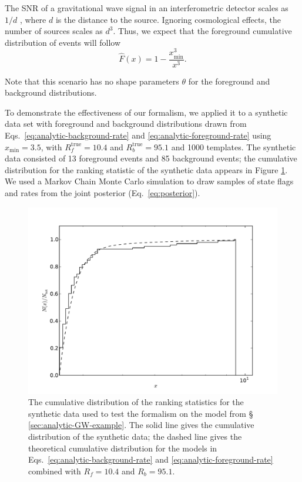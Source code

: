 \documentclass[aps,prd,reprint,nofootinbib]{revtex4-1}
\newcommand{\xmin}{x_\mathrm{min}}
\begin{document}
The SNR of a gravitational wave signal in an interferometric detector
scales as $1/d$ \citep{Finn1992}, where $d$ is the distance to the
source.  Ignoring cosmological effects, the number of sources scales
as $d^3$.  Thus, we expect that the foreground cumulative distribution
of events will follow
\begin{equation}
  \label{eq:analytic-foreground-rate}
  \hat{F}(x) = 1 - \frac{\xmin^3}{x^3}.
\end{equation}

Note that this scenario has no shape parameters $\theta$ for the
foreground and background distributions.

To demonstrate the effectiveness of our formalism, we applied it to a
synthetic data set with foreground and background distributions drawn
from Eqs.~\eqref{eq:analytic-background-rate} and
\eqref{eq:analytic-foreground-rate} using $x_\mathrm{min} = 3.5$, with
$R_f^\mathrm{true} = 10.4$ and $R_b^\mathrm{true} = 95.1$ and 1000
templates.  The synthetic data consisted of 13 foreground events and
85 background events; the cumulative distribution for the ranking
statistic of the synthetic data appears in Figure
\ref{fig:analytic-data-cumulative}.  We used a Markov Chain Monte
Carlo simulation to draw samples of state flags and rates from the
joint posterior (Eq.~\eqref{eq:posterior}).

\begin{figure}
  \includegraphics[width=\columnwidth]{data}
  \caption{\label{fig:analytic-data-cumulative} The cumulative
    distribution of the ranking statistics for the synthetic data used
    to test the formalism on the model from \S
    \ref{sec:analytic-GW-example}.  The solid line gives the
    cumulative distribution of the synthetic data; the dashed line
    gives the theoretical cumulative distribution for the models in
    Eqs.~\eqref{eq:analytic-background-rate} and
    \eqref{eq:analytic-foreground-rate} combined with $R_f = 10.4$ and
    $R_b = 95.1$.}
\end{figure}
\end{document}

